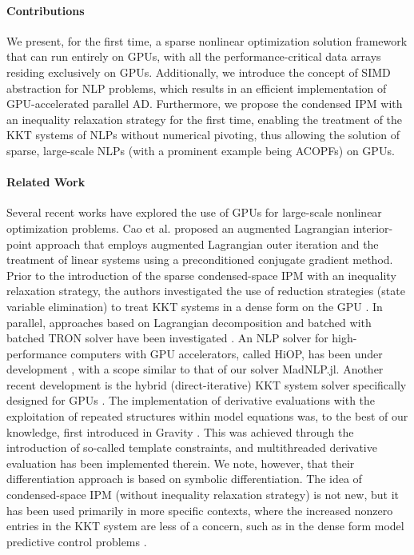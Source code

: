 \documentclass{IEEEtran4PSCC} %
\begin{document}
\paragraph*{Contributions}
We present, for the first time, a sparse nonlinear optimization
solution framework that can run entirely on GPUs, with all the
performance-critical data arrays residing exclusively on
GPUs. Additionally, we introduce the concept of SIMD abstraction for
NLP problems, which results in an efficient implementation of
GPU-accelerated parallel AD. Furthermore, we propose the condensed IPM
with an inequality relaxation strategy for the first time, enabling
the treatment of the KKT systems of NLPs without numerical pivoting,
thus allowing the solution of sparse, large-scale NLPs (with a
prominent example being ACOPFs) on GPUs.

\paragraph*{Related Work}
Several recent works have explored the use of GPUs for large-scale
nonlinear optimization problems. Cao et al. \cite{cao2016augmented}
proposed an augmented Lagrangian interior-point approach that employs
augmented Lagrangian outer iteration and the treatment of linear
systems using a preconditioned conjugate gradient method. Prior to the
introduction of the sparse condensed-space IPM with an inequality relaxation
strategy, the authors  investigated the use of reduction
strategies (state variable elimination) to treat KKT systems in a
dense form on the GPU
\cite{pacaud2023parallel,pacaud2022feasible,pacaud2023accelerating}.
In parallel, approaches based on Lagrangian decomposition and
batched with batched TRON solver \cite{lin1999newton}
have been investigated \cite{kim2022accelerated,kim2021leveraging}.
An NLP solver for high-performance computers  with GPU
accelerators, called HiOP, has been under development
\cite{hiop_techrep}, with a  scope similar to that of our solver MadNLP.jl.
 Another recent development is the hybrid (direct-iterative) KKT
system solver specifically designed for GPUs \cite{regev2023hykkt}.
The implementation of derivative evaluations with the exploitation of
repeated structures within model equations was, to the best of our
knowledge,  first introduced in Gravity \cite{Gravity}. This was
achieved through the introduction of so-called template constraints,
and multithreaded derivative evaluation has been implemented therein.
We note, however,  that their differentiation approach
is based on symbolic differentiation.
The idea of condensed-space IPM (without inequality relaxation
strategy) is not new, but it has been used primarily in more
specific contexts, where the increased nonzero entries in the KKT system
are less of a concern, such as in the dense form model predictive control
problems \cite{jerez2012sparse,cole2023exploiting}.
\end{document}

